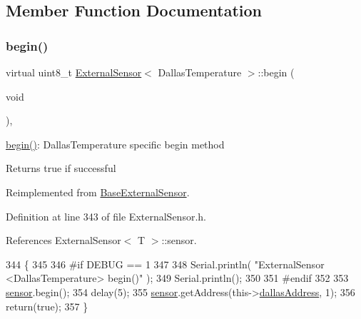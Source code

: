 \subsection{Member Function Documentation}
\mbox{\label{classExternalSensor_3_01DallasTemperature_01_4_ac5275129b05e2ff8df45d5b222a661d9}} 
\subsubsection{\texorpdfstring{begin()}{begin()}}
{\footnotesize\ttfamily virtual uint8\+\_\+t \hyperlink{classExternalSensor}{External\+Sensor}$<$ Dallas\+Temperature $>$\+::begin (\begin{DoxyParamCaption}\item[{void}]{ }\end{DoxyParamCaption})\hspace{0.3cm}{\ttfamily [inline]}, {\ttfamily [virtual]}}

\hyperlink{classExternalSensor_3_01DallasTemperature_01_4_ac5275129b05e2ff8df45d5b222a661d9}{begin()}\+: Dallas\+Temperature specific begin method

\begin{DoxyReturn}{Returns}
true if successful 
\end{DoxyReturn}


Reimplemented from \hyperlink{classBaseExternalSensor_a87d132803d4f4fdd4e66332809f0c9a0}{Base\+External\+Sensor}.



Definition at line 343 of file External\+Sensor.\+h.



References External\+Sensor$<$ T $>$\+::sensor.


\begin{DoxyCode}
344     \{
345     
346 \textcolor{preprocessor}{    #if DEBUG == 1 }
347 
348         Serial.println( \textcolor{stringliteral}{"ExternalSensor <DallasTemperature> begin()"} );
349         Serial.println();
350     
351 \textcolor{preprocessor}{    #endif}
352     
353         \hyperlink{classExternalSensor_3_01DallasTemperature_01_4_adb6ba4fcdedef95ad8f6b0c9b6c0f9d1}{sensor}.begin(); 
354         delay(5);
355         \hyperlink{classExternalSensor_3_01DallasTemperature_01_4_adb6ba4fcdedef95ad8f6b0c9b6c0f9d1}{sensor}.getAddress(this->\hyperlink{classExternalSensor_3_01DallasTemperature_01_4_a7d9e9d2893e453638fcf440e5d8d9082}{dallasAddress}, 1);   
356         \textcolor{keywordflow}{return}(\textcolor{keyword}{true});
357     \}
\end{DoxyCode}
\mbox{\label{classExternalSensor_3_01DallasTemperature_01_4_a1e725d9338314515d4e5dc456ed6a6c8}} 
